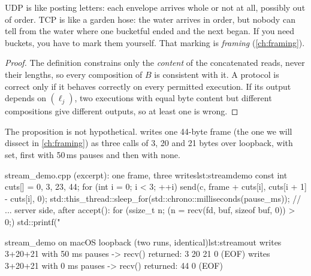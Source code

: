 \begin{layman}
UDP is like posting letters: each envelope arrives whole or not at all, possibly out of order. TCP is like a garden
hose: the water arrives in order, but nobody can tell from the water where one bucketful ended and the next began. If
you need buckets, you have to mark them yourself. That marking is \emph{framing} (\cref{ch:framing}).
\end{layman}

\begin{proof}
The definition constrains only the \emph{content} of the concatenated reads, never their lengths, so every
composition of $B$ is consistent with it. A protocol is correct only if it behaves correctly on every permitted
execution. If its output depends on $(\ell_j)$, two executions with equal byte content but different compositions give
different outputs, so at least one is wrong.
\end{proof}

The proposition is not hypothetical.  writes one 44-byte frame (the one we will dissect in
\cref{ch:framing}) as three  calls of 3, 20 and 21 bytes over loopback, with  set, first with
50\,ms pauses and then with none.

\begin{code}{stream\_demo.cpp (excerpt): one frame, three writes}{lst:streamdemo}
const int cuts[] = {0, 3, 23, 44};
for (int i = 0; i < 3; ++i) {
    send(c, frame + cuts[i], cuts[i + 1] - cuts[i], 0);
    std::this_thread::sleep_for(std::chrono::milliseconds(pause_ms));
}
// ... server side, after accept():
for (ssize_t n; (n = recv(fd, buf, sizeof buf, 0)) > 0;) std::printf(" %
\end{code}

\begin{progout}{stream\_demo on macOS loopback (two runs, identical)}{lst:streamout}
writes 3+20+21 with 50 ms pauses -> recv() returned: 3 20 21 0 (EOF)
writes 3+20+21 with 0 ms pauses -> recv() returned: 44 0 (EOF)
\end{progout}

